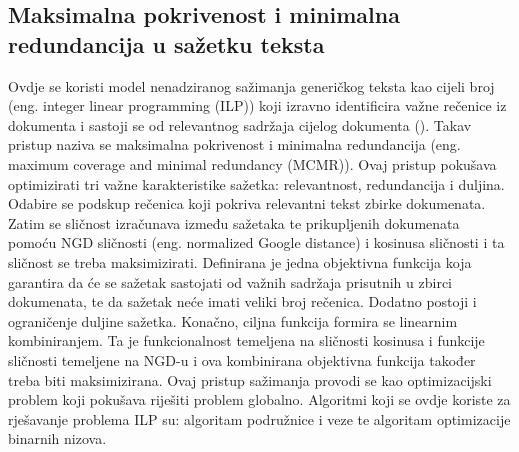 \documentclass[times, utf8, zavrsni, numeric]{fer}
\begin{document}
\subsection{Maksimalna pokrivenost i minimalna redundancija u sažetku teksta}
Ovdje se koristi model nenadziranog sažimanja generičkog teksta kao cijeli broj (eng. integer linear programming (ILP)) koji izravno identificira važne rečenice iz dokumenta i sastoji se od relevantnog sadržaja cijelog dokumenta (\citet{article1}).
Takav pristup naziva se maksimalna pokrivenost i minimalna redundancija (eng. maximum coverage and minimal redundancy (MCMR)).
Ovaj pristup pokušava optimizirati tri važne karakteristike sažetka: relevantnost, redundancija i duljina.
Odabire se podskup rečenica koji pokriva relevantni tekst zbirke dokumenata.
Zatim se sličnost izračunava između sažetaka te prikupljenih dokumenata pomoću NGD sličnosti (eng. normalized Google distance) i kosinusa sličnosti i ta sličnost se treba maksimizirati.
Definirana je jedna objektivna funkcija koja garantira da će se sažetak sastojati od važnih sadržaja prisutnih u zbirci dokumenata, te da sažetak neće imati veliki broj rečenica.
Dodatno postoji i ograničenje duljine sažetka.
Konačno, ciljna funkcija formira se linearnim kombiniranjem.
Ta je funkcionalnost temeljena na sličnosti kosinusa i funkcije sličnosti temeljene na NGD-u i ova kombinirana objektivna funkcija također treba biti maksimizirana.
Ovaj pristup sažimanja provodi se kao optimizacijski problem koji pokušava riješiti problem globalno.
Algoritmi koji se ovdje koriste za rješavanje problema ILP su: algoritam podružnice i veze te algoritam optimizacije binarnih nizova.
\end{document}
